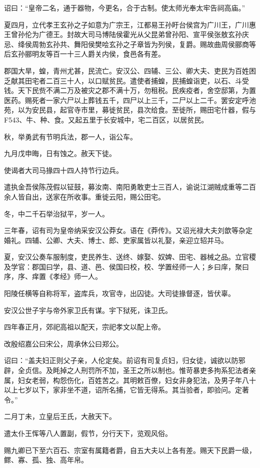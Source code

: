\documentclass[]{article}
\begin{document}
诏曰：``皇帝二名，通于器物，今更名，合于古制。使太师光奉太牢告祠高庙。''

夏四月，立代孝王玄孙之子如意为广宗王，江都易王孙盱台侯宫为广川王，广川惠王曾孙伦为广德王。封故大司马博陆侯霍光从父昆弟曾孙阳、宣平侯张敖玄孙庆忌、绛侯周勃玄孙共、舞阳侯樊哙玄孙之子章皆为列侯，复爵。赐故曲周侯郦商等后玄孙郦明友等百一十三人爵关内侯，食邑各有差。

郡国大旱，蝗，青州尤甚，民流亡。安汉公、四辅、三公、卿大夫、吏民为百姓困乏献其田宅者二百三十人，以口赋贫民。遣使者捕蝗，民捕蝗诣吏，以石、斗受钱。天下民赀不满二万及被灾之郡不满十万，勿租税。民疾疫者，舍空邸第，为置医药。赐死者一家六尸以上葬钱五千，四尸以上三千，二尸以上二千。罢安定呼池苑，以为安民县，起官寺市里，募徙贫民，县次给食。至徙所，赐田宅什器，假与F543、牛、种、食。又起五里于长安城中，宅二百区，以居贫民。

秋，举勇武有节明兵法，郡一人，诣公车。

九月戊申晦，日有蚀之。赦天下徒。

使谒者大司马掾四十四人持节行边兵。

遣执金吾侯陈茂假以钲鼓，募汝南、南阳勇敢吏士三百人，谕说江湖贼成重等二百余人皆自出，送家在所收事。重徙云阳，赐公田宅。

冬，中二千石举治狱平，岁一人。

三年春，诏有司为皇帝纳采安汉公莽女。语在《莽传》。又诏光禄大夫刘歆等杂定婚礼。四辅、公卿、大夫、博士、郎、吏家属皆以礼娶，亲迎立轺并马。

夏，安汉公奏车服制度，吏民养生、送终、嫁娶、奴婢、田宅、器械之品。立官稷及学官：郡国曰学，县、道、邑、侯国曰校，校、学置经师一人；乡曰庠，聚曰序，序、痒置《孝经》师一人。

阳陵任横等自称将军，盗库兵，攻官寺，出囚徒。大司徒掾督逐，皆伏辜。

安汉公世子宇与帝外家卫氏有谋。宇下狱死，诛卫氏。

四年春正月，郊祀高祖以配天，宗祀孝文以配上帝。

改殷绍嘉公曰宋公，周承休公曰郑公。

诏曰：``盖夫妇正则父子亲，人伦定矣。前诏有司复贞妇，归女徒，诚欲以防邪辟，全贞信。及眊掉之人刑罚所不加，圣王之所以制也。惟苛暴吏多拘系犯法者亲属，妇女老弱，构怨伤化，百姓苦之。其明敕百僚，妇女非身犯法，及男子年八十以上七岁以下，家非坐不道，诏所名捕，它皆无得系。其当验者，即验问。定著令。''

二月丁未，立皇后王氏，大赦天下。

遣太仆王恽等八人置副，假节，分行天下，览观风俗。

赐九卿已下至六百石、宗室有属籍者爵，自五大夫以上各有差。赐天下民爵一级，鳏、寡、孤、独、高年帛。
\end{document}
